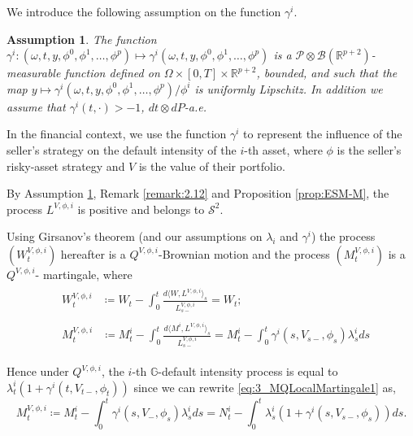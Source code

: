 \documentclass[11pt,a4paper]{article}
\numberwithin{equation}{section}
\theoremstyle{newPlain}
\theoremstyle{newDefinition}
\newtheorem{assumption}{Assumption}[theorem]
\theoremstyle{newRemark}
\begin{document}
We introduce  the following assumption on  the function $\gamma^i$. 

\begin{assumption}\label{assumption:Gammai}
  The function  $\gamma^i:(\omega, t, y, \phi^0,\phi^1,\ldots,\phi^p)\mapsto\gamma^i(\omega,t,y,\phi^0,\phi^1,\ldots,\phi^p)$ is a $\mathcal{P}\otimes\mathcal{B}(\mathbb{R}^{p+2})$-measurable function defined on $\Omega\times[0,T]\times\mathbb{R}^{p+2}$, bounded, and such that the map $y\mapsto\gamma^i(\omega,t,y,\phi^0,\phi^1,\ldots,\phi^p)/\phi^i$ is uniformly Lipschitz. In addition we  assume that $\gamma^i(t,\cdot)>-1$, $dt\otimes dP$-a.e. 
\end{assumption}

In the financial context, we use  the function $\gamma^i$ to represent the influence of the seller's strategy on the default intensity of the $i$-th asset, where $\phi$ is the seller's risky-asset strategy and $V$ is the value of their portfolio.

By Assumption \ref{assumption:Gammai}, Remark \ref{remark:2.12} and Proposition \ref{prop:ESM-M}, the process $L^{V,\phi,i}$ is positive and belongs to $\mathcal{S}^2$.

Using  Girsanov's theorem (and our assumptions on $\lambda_i$ and $\gamma^i$)  the process   $(W_t^{V,\phi,i})$ hereafter is a $Q^{V,\phi,i}$-Brownian motion and the process $(M_t^{V,\phi,i})$ is a $Q^{V,\phi,i}$- martingale, where 
\begin{align}
    &\begin{aligned}
        W_t^{V,\phi,i} &\coloneqq W_t - \int_0^t\frac{d\langle W,L^{V,\phi,i}\rangle_s}{L_{s-}^{V,\phi,i}}= W_t;
    \end{aligned}\label{eq:3_WQMartingale1}\\
    &\begin{aligned}
        M_t^{V,\phi,i} &\coloneqq M_t^i - \int_0^t\frac{d\langle M^i,L^{V,\phi,i}\rangle_s}{L_{s-}^{V,\phi,i}}
        = M_t^i - \int_0^t\gamma^i(s,V_{s-},\phi_s)\lambda_s^ids
    \end{aligned}\label{eq:3_MQLocalMartingale1}
\end{align}

 Hence under $Q^{V,\phi,i}$, the $i$-th $\mathbb{G}$-default intensity process is equal to $\lambda_t^i(1+\gamma^i(t,V_{t-},\phi_t))$ since we can rewrite \eqref{eq:3_MQLocalMartingale1} as,
\begin{equation*}
    M_t^{V,\phi,i}\coloneqq M_t^i - \int_0^t\gamma^i(s,V_{-},\phi_s)\lambda_s^ids=N_t^i-\int_0^t\lambda_s^i(1+\gamma^i(s,V_{s-},\phi_s))ds.
\end{equation*}
\end{document}
